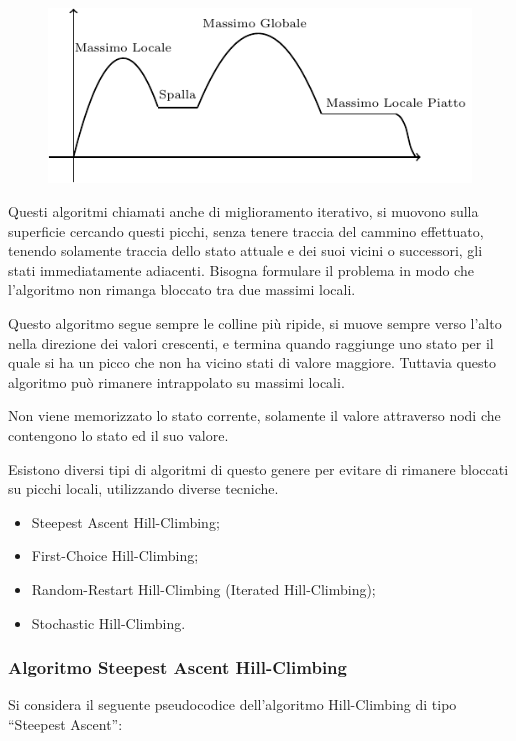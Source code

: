 \documentclass{article}
\numberwithin{equation}{subsection}
\begin{document}
\begin{figure}[H]%
    \centering%
    \includegraphics[scale=1.25]{grafico_massimi.pdf}%
\end{figure}

Questi algoritmi chiamati anche di miglioramento iterativo, si muovono sulla superficie cercando questi picchi, senza tenere traccia del cammino effettuato, tenendo 
solamente traccia dello stato attuale e dei suoi vicini o successori, gli stati immediatamente adiacenti. 
Bisogna formulare il problema in modo che l'algoritmo non rimanga bloccato tra due massimi locali. 

Questo algoritmo segue sempre le colline più ripide, si muove sempre verso l'alto nella direzione dei valori crescenti, e termina quando raggiunge uno stato per il quale 
si ha un picco che non ha vicino stati di valore maggiore. Tuttavia questo algoritmo può rimanere intrappolato su massimi locali. 

Non viene memorizzato lo stato corrente, solamente il valore attraverso nodi che contengono lo stato ed il suo valore. 

Esistono diversi tipi di algoritmi di questo genere per evitare di rimanere bloccati su picchi locali, utilizzando diverse tecniche. 
\begin{itemize}
    \item Steepest Ascent Hill-Climbing;
    \item First-Choice Hill-Climbing;
    \item Random-Restart Hill-Climbing (Iterated Hill-Climbing);
    \item Stochastic Hill-Climbing. 
\end{itemize}

\subsubsection{Algoritmo Steepest Ascent Hill-Climbing}

Si considera il seguente pseudocodice dell'algoritmo Hill-Climbing di tipo ``Steepest Ascent'':
\end{document}
